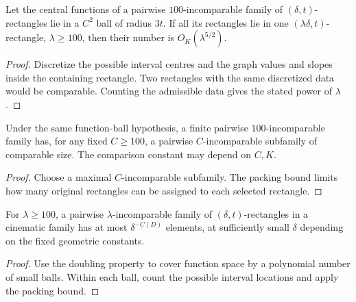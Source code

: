 \begin{lemma}
\label{lem:rectangle-packing}
\leanok
{}
Let the central functions of a pairwise $100$-incomparable
family of $(\delta,t)$-rectangles lie in a $C^2$ ball of
radius $3t$. If all its rectangles lie in one
$(\lambda\delta,t)$-rectangle, $\lambda\geq100$, then
their number is $O_K(\lambda^{5/2})$.
\end{lemma}
\begin{proof}
\leanok
Discretize the possible interval centres and the graph values
and slopes inside the containing rectangle. Two rectangles
with the same discretized data would be comparable. Counting
the admissible data gives the stated power of $\lambda$.
\end{proof}

\begin{lemma}
\label{lem:increase-incomparability}
Under the same function-ball hypothesis, a finite pairwise
$100$-incomparable family has, for any fixed $C\geq100$,
a pairwise $C$-incomparable subfamily of comparable size.
The comparison constant may depend on $C,K$.
\end{lemma}
\begin{proof}
Choose a maximal $C$-incomparable subfamily. The packing
bound limits how many original rectangles can be assigned
to each selected rectangle.
\end{proof}

\begin{lemma}
\label{lem:rectangle-coarse-count}
For $\lambda\geq100$, a pairwise $\lambda$-incomparable
family of $(\delta,t)$-rectangles in a cinematic family
has at most $\delta^{-C(D)}$ elements, at sufficiently
small $\delta$ depending on the fixed geometric constants.
\end{lemma}
\begin{proof}
Use the doubling property to cover function space by a
polynomial number of small balls. Within each ball, count
the possible interval locations and apply the packing bound.
\end{proof}


